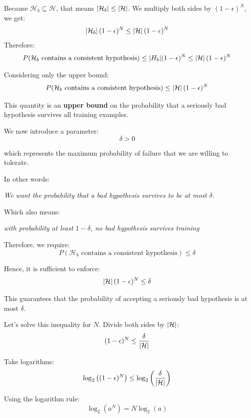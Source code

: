 Because $\mathcal{H}_b \subseteq \mathcal{H}$, that means $\left\lvert\mathcal{H}_b\right\rvert \leq \left\lvert\mathcal{H}\right\rvert$. We multiply both sides by $(1-\epsilon)^N$, we get:
\[
\left\lvert\mathcal{H}_b\right\rvert (1-\epsilon)^N \leq \left\lvert\mathcal{H}\right\rvert (1-\epsilon)^N
\]
Therefore:
\[
P(\mathcal H_b \text{ contains a consistent hypothesis})
\leq
|\mathcal H_b|(1-\epsilon)^N
\leq
\left\lvert\mathcal{H}\right\rvert (1-\epsilon)^N
\]

Considering only the upper bound:
\[
P(\mathcal H_b \text{ contains a consistent hypothesis})
\leq
\left\lvert\mathcal{H}\right\rvert (1-\epsilon)^N
\]

This quantity is an \textbf{upper bound} on the probability that a seriously bad hypothesis survives all training examples.

We now introduce a parameter:
\[
\delta > 0
\]

which represents the maximum probability of failure that we are willing to tolerate.

In other words:

\begin{center}
\textit{We want the probability that a bad hypothesis survives to be at most $\delta$.}
\end{center}

Which also means:
\begin{center}
\textit{with probability at least $1-\delta$, no bad hypothesis survives training}
\end{center}



Therefore, we require:
\[
P(\mathcal H_b \text{ contains a consistent hypothesis})
\leq
\delta
\]


Hence, it is sufficient to enforce:
\[
\left\lvert\mathcal{H}\right\rvert(1-\epsilon)^N
\leq
\delta
\]

This guarantees that the probability of accepting a seriously bad hypothesis is at most $\delta$.

\bigskip

Let's solve this inequality for $N$. Divide both sides by $\left\lvert\mathcal{H}\right\rvert$:
\[
(1-\epsilon)^N
\leq
\frac{\delta}{\left\lvert\mathcal{H}\right\rvert}
\]

Take logarithms:
\[
\log_2\left((1-\epsilon)^N\right)
\leq
\log_2\left(\frac{\delta}{\left\lvert\mathcal{H}\right\rvert}\right)
\]

Using the logarithm rule:
\[
\log_2(a^N)=N\log_2(a)
\]

